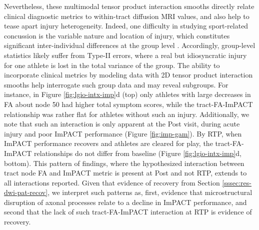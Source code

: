 \documentclass[12pt]{article}
\begin{document}
Nevertheless, these multimodal tensor product interaction smooths directly relate clinical diagnostic metrics to within-tract diffusion MRI values, and also help to tease apart injury heterogeneity. Indeed, one difficulty in studying sport-related concussion is the variable nature and location of injury, which constitutes significant inter-individual differences at the group level \parencite{lindsey2023DiffusionWeightedImagingMild}. Accordingly, group-level statistics likely suffer from Type-II errors, where a real but idiosyncratic injury for one athlete is lost in the total variance of the group. The ability to incorporate clinical metrics by modeling data with 2D tensor product interaction smooths help interrogate such group data and may reveal subgroups. For instance, in Figure \ref{fig:lgio-intx-imp}d (top) only athletes with large decreases in FA about node 50 had higher total symptom scores, while the tract-FA-ImPACT relationship was rather flat for athletes without such an injury. Additionally, we note that such an interaction is only apparent at the Post visit, during acute injury and poor ImPACT performance (Figure \ref{fig:imp-gam}). By RTP, when ImPACT performance recovers and athletes are cleared for play, the tract-FA-ImPACT relationships do not differ from baseline (Figure \ref{fig:lgio-intx-imp}d, bottom). This pattern of findings, where the hypothesized interaction between tract node FA and ImPACT metric is present at Post and not RTP, extends to all interactions reported. Given that evidence of recovery from Section \ref{sssec:res-dwi-pat-recov}, we interpret such patterns as, first, evidence that microstructural disruption of axonal processes relate to a decline in ImPACT performance, and second that the lack of such tract-FA-ImPACT interaction at RTP is evidence of recovery.
\end{document}
